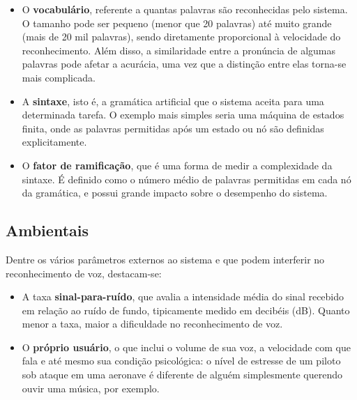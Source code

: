 \begin{itemize}
\item O \textbf{vocabulário}, referente a quantas palavras são reconhecidas pelo sistema. O tamanho pode ser pequeno (menor que 20 palavras) até muito grande (mais de 20 mil palavras), sendo diretamente proporcional à velocidade do reconhecimento. Além disso, a similaridade entre a pronúncia de algumas palavras pode afetar a acurácia, uma vez que a distinção entre elas torna-se mais complicada.

\item A \textbf{sintaxe}, isto é, a gramática artificial que o sistema aceita para uma determinada tarefa. O exemplo mais simples seria uma máquina de estados finita, onde as palavras permitidas após um estado ou nó são definidas explicitamente.

\item O \textbf{fator de ramificação}, que é uma forma de medir a complexidade da sintaxe. É definido como o número médio de palavras permitidas em cada nó da gramática, e possui grande impacto sobre o desempenho do sistema.
\end{itemize}


\subsection{Ambientais}

Dentre os vários parâmetros externos ao sistema e que podem interferir no reconhecimento de voz, destacam-se:

\begin{itemize}
\item A taxa \textbf{sinal-para-ruído}, que avalia a intensidade média do sinal recebido em relação ao ruído de fundo, tipicamente medido em decibéis (dB). Quanto menor a taxa, maior a dificuldade no reconhecimento de voz.

\item O \textbf{próprio usuário}, o que inclui o volume de sua voz, a velocidade com que fala e até mesmo sua condição psicológica: o nível de estresse de um piloto sob ataque em uma aeronave é diferente de alguém simplesmente querendo ouvir uma música, por exemplo.
\end{itemize}
